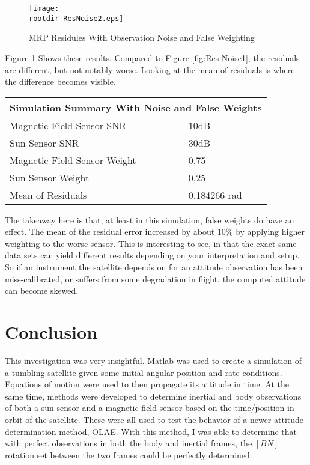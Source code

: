 \documentclass[11pt]{aiaa-tc}%
\newcommand{\rootdir}{./Figures/}
\begin{document}
\begin{centering}
	\begin{figure}[Hh]
		\texttt{[image: \\rootdir ResNoise2.eps]}
		\caption{MRP Residules With Observation Noise and False Weighting}
		\label{fig:Res Noise2}
	\end{figure}
\end{centering}


Figure \ref{fig:Res Noise2} Shows these results. Compared to Figure \ref{fig:Res Noise1}, the residuals are different, but not notably worse. Looking at the mean of residuals is where the difference becomes visible. 


\begin{center}
\label{table:Simulation Noise False Weights}
\begin{tabular}{ |l|l| }
  \hline
	  \multicolumn{2}{|c|}{Simulation Summary With Noise and False Weights} \\
	  \hline
	  Magnetic Field Sensor SNR & 10dB \\
	  Sun Sensor SNR & 30dB \\
	  Magnetic Field Sensor Weight & 0.75 \\
	  Sun Sensor Weight & 0.25 \\
	  Mean of Residuals & 0.184266 rad\\
	  \hline
	\end{tabular}
\end{center}

The takeaway here is that, at least in this simulation, false weights do have an effect. The mean of the residual error increased by about 10\% by applying higher weighting to the worse sensor. This is interesting to see, in that the exact same data sets can yield different results depending on your interpretation and setup. So if an instrument the satellite depends on for an attitude observation has been miss-calibrated, or suffers from some degradation in flight, the computed attitude can become skewed. 


\newpage

\section{Conclusion}
This investigation was very insightful. Matlab was used to create a simulation of a tumbling satellite given some initial angular position and rate conditions. Equations of motion were used to then propagate its attitude in time. At the same time, methods were developed to determine inertial and body observations of both a sun sensor and a magnetic field sensor based on the time/position in orbit of the satellite. These were all used to test the behavior of a newer attitude determination method, OLAE. With this method, I was able to determine that with perfect observations in both the body and inertial frames, the $[BN]$ rotation set between the two frames could be perfectly determined. 
\end{document}
